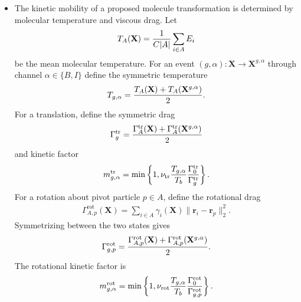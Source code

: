 \documentclass[12pt,letterpaper]{article}
\newcommand{\mb}{\mathbf}
\begin{document}
\begin{itemize}
\begin{align*}
\Delta U_{g} = \sum_{\{i,j\}\in D_{g}}\Delta U_{ij},
\end{align*}
where $D_{g}$ is the set of cross-molecule pairs whose contact state changes. The local energy update is
\begin{align*}
E_{i}' &\leftarrow E_{i}'-{\Delta U_{ij}\over 2}, \\
E_{j}' &\leftarrow E_{j}'-{\Delta U_{ij}\over 2}
\end{align*}
for every $\{i,j\}\in D_{g}$, beginning from $\mb{E}'=\mb{E}$. Thus a newly formed weak contact deposits $\eta/2$ into each endpoint, while a broken weak contact removes $\eta/2$ from each endpoint. This assignment is local, symmetric, and satisfies $\Delta E_{g}=-\Delta U_{g}$ exactly.
\item The kinetic mobility of a proposed molecule transformation is determined by molecular temperature and viscous drag. Let
\begin{align*}
T_{A}(\mb{X}) = {1 \over C|A|}\sum_{i\in A}E_{i}
\end{align*}
be the mean molecular temperature. For an event $(g,\alpha):\mb{X}\to\mb{X}^{g,\alpha}$ through channel $\alpha\in\{B,I\}$ define the symmetric temperature
\begin{align*}
T_{g,\alpha} = {T_{A}(\mb{X})+T_{A}(\mb{X}^{g,\alpha}) \over 2}.
\end{align*}
For a translation, define the symmetric drag
\begin{align*}
\Gamma_{g}^{\mathrm{tr}} = {\Gamma_{A}^{\mathrm{tr}}(\mb{X})+\Gamma_{A}^{\mathrm{tr}}(\mb{X}^{g,\alpha}) \over 2}
\end{align*}
and kinetic factor
\begin{align*}
m_{g,\alpha}^{\mathrm{tr}} = \min\left\{1,\nu_{\mathrm{tr}}{T_{g,\alpha} \over T_{b}}{\Gamma_{0}^{\mathrm{tr}} \over \Gamma_{g}^{\mathrm{tr}}}\right\}.
\end{align*}
For a rotation about pivot particle $p\in A$, define the rotational drag
\begin{align*}
\Gamma_{A,p}^{\mathrm{rot}}(\mb{X}) = \sum_{i\in A}\gamma_{i}(\mb{X})\|\mb{r}_{i}-\mb{r}_{p}\|_{2}^{2}.
\end{align*}
Symmetrizing between the two states gives
\begin{align*}
\Gamma_{g,p}^{\mathrm{rot}} = {\Gamma_{A,p}^{\mathrm{rot}}(\mb{X})+\Gamma_{A,p}^{\mathrm{rot}}(\mb{X}^{g,\alpha})\over 2}.
\end{align*}
The rotational kinetic factor is
\begin{align*}
m_{g,\alpha}^{\mathrm{rot}} = \min\left\{1,\nu_{\mathrm{rot}}{T_{g,\alpha} \over T_{b}}{\Gamma_{0}^{\mathrm{rot}} \over \Gamma_{g,p}^{\mathrm{rot}}}\right\}.

\end{align*}
\end{itemize}
\end{document}
